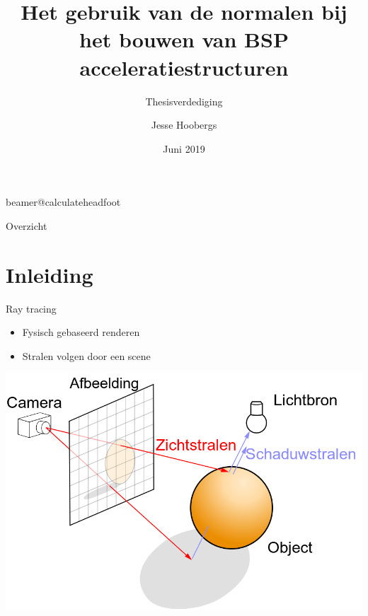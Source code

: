 \documentclass[11pt,t]{beamer}
\title[Het gebruik van de normalen bij het bouwen van $\symBSP$ acceleratiestructuren]{Het gebruik van de normalen bij het bouwen van BSP acceleratiestructuren} %
\subtitle{Thesisverdediging}
\author{Jesse Hoobergs}
\institute{KU Leuven}
\date{Juni 2019}
\begin{document}
\csname beamer@calculateheadfoot\endcsname %


\begin{frame}
	\titlepage
\end{frame}
	

\begin{frame}{Overzicht}
	\hfill	{\large \parbox{.961\textwidth}{\tableofcontents[hideothersubsections]}}
\end{frame}







\section{Inleiding}
\begin{frame}{Ray tracing}  %
\begin{itemize}
	\item Fysisch gebaseerd renderen
	\item Stralen volgen door een scene
\end{itemize}
\pause
\vspace{5pt}
\hspace{5pt}
\includegraphics[height=.6\paperheight]{../img/ray-tracing}

\end{frame}
\end{document}
